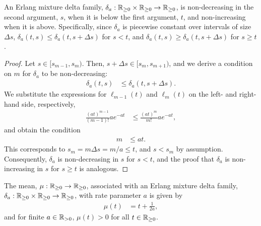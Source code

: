 \begin{lemma}\label{lem:erlang:mixture:delta:family:monotonicity}
	An Erlang mixture delta family, $\delta_a: \mathbb{R}_{\geq 0} \times \mathbb{R}_{\geq 0} \rightarrow \mathbb{R}_{\geq 0}$, is non-decreasing in the second argument, $s$, when it is below the first argument, $t$, and non-increasing when it is above. Specifically, since $\delta_a$ is piecewise constant over intervals of size $\Delta s$, $\delta_a(t, s) \leq \delta_a(t, s + \Delta s)$ for $s < t$, and $\delta_a(t, s) \geq \delta_a(t, s + \Delta s)$ for $s \geq t$.
\end{lemma}
%
\begin{proof}
	Let $s \in [s_{m-1}, s_m)$. Then, $s + \Delta s \in [s_m, s_{m+1})$, and we derive a condition on $m$ for $\delta_a$ to be non-decreasing:
	\begin{align}
		\delta_a(t, s) &\leq \delta_a(t, s + \Delta s).
	\end{align}
	We substitute the expressions for $\ell_{m-1}(t)$ and $\ell_m(t)$ on the left- and right-hand side, respectively,
	\begin{align}
		\frac{(at)^{m-1}}{(m-1)!} a e^{-at} &\leq \frac{(at)^m}{m!} a e^{-at},
	\end{align}
	and obtain the condition
	\begin{align}
		m &\leq at.
	\end{align}
	This corresponds to $s_m = m \Delta s = m/a \leq t$, and $s < s_m$ by assumption. Consequently, $\delta_a$ is non-decreasing in $s$ for $s < t$, and the proof that $\delta_a$ is non-increasing in $s$ for $s \geq t$ is analogous.
\end{proof}
%
\begin{lemma}
	The mean, $\mu: \mathbb{R}_{\geq 0} \rightarrow \mathbb{R}_{\geq 0}$, associated with an Erlang mixture delta family, $\delta_a: \mathbb{R}_{\geq 0} \times \mathbb{R}_{\geq 0} \rightarrow \mathbb{R}_{\geq 0}$, with rate parameter $a$ is given by
	\begin{align}\label{eq:erlang:mixture:delta:family:mean}
		\mu(t) &= t + \frac{1}{2a},
	\end{align}
	and for finite $a \in \mathbb{R}_{> 0}$, $\mu(t) > 0$ for all $t \in \mathbb{R}_{\geq 0}$.
\end{lemma}
%
